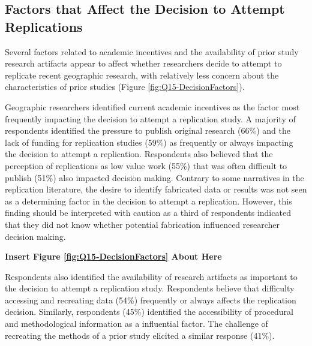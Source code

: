 \documentclass[]{interact}
\theoremstyle{plain}%
\theoremstyle{definition}
\theoremstyle{remark}
\begin{document}
\subsection*{Factors that Affect the Decision to Attempt Replications}
Several factors related to academic incentives and the availability of prior study research artifacts appear to affect whether researchers decide to attempt to replicate recent geographic research, with relatively less concern about the characteristics of prior studies (Figure \ref{fig:Q15-DecisionFactors}).

Geographic researchers identified current academic incentives as the factor most frequently impacting the decision to attempt a replication study. 
A majority of respondents identified the pressure to publish original research (66\%) and the lack of funding for replication studies (59\%) as frequently or always impacting the decision to attempt a replication.
Respondents also believed that the perception of replications as low value work (55\%) that was often difficult to publish (51\%) also impacted decision making.  
Contrary to some narratives in the replication literature, the desire to identify fabricated data or results was not seen as a determining factor in the decision to attempt a replication. 
However, this finding should be interpreted with caution as a third of respondents indicated that they did not know whether potential fabrication influenced researcher decision making.  

\begin{center}
\textbf{Insert Figure \ref{fig:Q15-DecisionFactors} About Here}
\end{center}

Respondents also identified the availability of research artifacts as important to the decision to attempt a replication study.
Respondents believe that difficulty accessing and recreating data (54\%) frequently or always affects the replication decision.
Similarly, respondents (45\%) identified the accessibility of procedural and methodological information as a influential factor. 
The challenge of recreating the methods of a prior study elicited a similar response (41\%).
\end{document}
